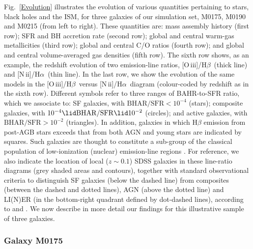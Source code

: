 \documentclass[fleqn,usenatbib]{mnras}
\newcommand{\oiiihb}{\hbox{[O\,{\sc iii}]/H$\beta$}}
\newcommand{\niiha}{\hbox{[N\,{\sc ii}]/H$\alpha$}}
\begin{document}
Fig.~\ref{Evolution} illustrates the evolution of various quantities
pertaining  to stars, black holes and the ISM, for three galaxies of
our simulation set, M0175, M0190 and M0215 (from left to right). These
quantities are: mass assembly history (first row); SFR and BH
accretion rate (second row); global and central warm-gas metallicities
(third row); global and central C/O ratios (fourth row); and global
and central volume-averaged gas densities (fifth row). The sixth row
shows, as an example, the redshift evolution of two emission-line
ratios, \oiiihb\ (thick line) and \niiha\ (thin line). In the last
row, we show the evolution of the same models in the \oiiihb\  versus
\niiha\ diagram (colour-coded by redshift as in the sixth
row). Different symbols  refer to three ranges of BAHR-to-SFR ratio,
which we associate to: SF galaxies, with $\mathrm{BHAR/SFR <10^{-4}}$
(stars); composite galaxies, with $10^{-4}\lid\mathrm{BHAR/SFR}\lid
10^{-2}$ (circles); and active galaxies, with $\mathrm{BHAR/SFR} >
10^{-2}$ (triangles). In addition, galaxies in which H$\beta$ emission
from post-AGB stars exceeds that from both AGN and young stars are
indicated by squares. Such galaxies are thought to constitute a
sub-group of the classical population of low-ionization (nuclear)
emission-line regions \citep[LINER/LIER; e.g.][]{Singh13,
  Belfiore16}. For reference, we also indicate the location of local
($z\sim0.1$) SDSS galaxies in these line-ratio diagrams (grey shaded
areas and contours), together with standard observational criteria to
distinguish SF galaxies (below the dashed line) from composites
(between the dashed and dotted lines), AGN (above the dotted line) and
LI(N)ER (in the bottom-right quadrant defined by dot-dashed lines),
according  to \citet[][dotted line]{Kewley01} and \citet[][dashed and
dot-dashed lines]{Kauffmann03}.  We now describe in more detail our
findings for this illustrative sample of three galaxies.  

\subsubsection{Galaxy M0175}\label{galm0175}
\end{document}
